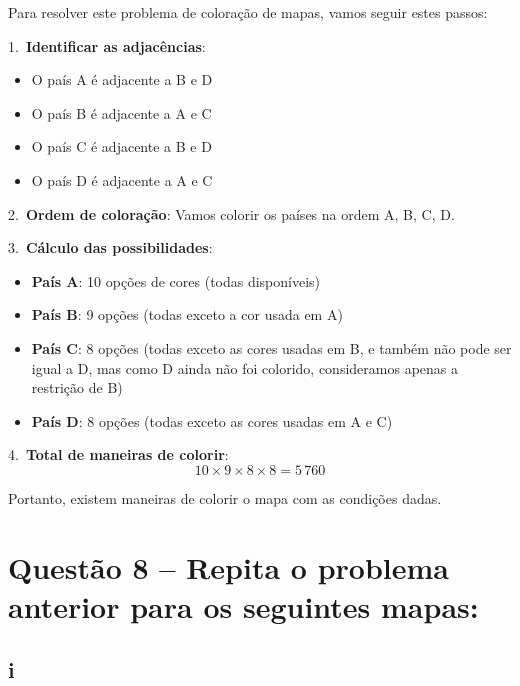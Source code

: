 \documentclass[12pt,a4paper]{article}
\begin{document}
    Para resolver este problema de coloração de mapas, vamos seguir estes passos:

    1.~\textbf{Identificar as adjacências}:
    \begin{itemize}
    \item O país A é adjacente a B e D
    \item O país B é adjacente a A e C
    \item O país C é adjacente a B e D
    \item O país D é adjacente a A e C
    \end{itemize}

    2.~\textbf{Ordem de coloração}: Vamos colorir os países na ordem A, B, C, D.

    3.~\textbf{Cálculo das possibilidades}:
    \begin{itemize}
        \item \textbf{País A}: 10 opções de cores (todas disponíveis)
        \item \textbf{País B}: 9 opções (todas exceto a cor usada em A)
        \item \textbf{País C}: 8 opções (todas exceto as cores usadas em B, e também não pode ser igual a D, mas como D ainda não foi colorido, consideramos apenas a restrição de B)
        \item \textbf{País D}: 8 opções (todas exceto as cores usadas em A e C)
    \end{itemize}

    4.~\textbf{Total de maneiras de colorir}:
    \[
    10 \times 9 \times 8 \times 8 = 5\,760
    \]

    Portanto, existem  maneiras de colorir o mapa com as condições dadas.

\section*{Questão 8 -- Repita o problema anterior para os seguintes mapas:}

    \subsection*{i}

    \vspace{0.5cm}

\end{document}
